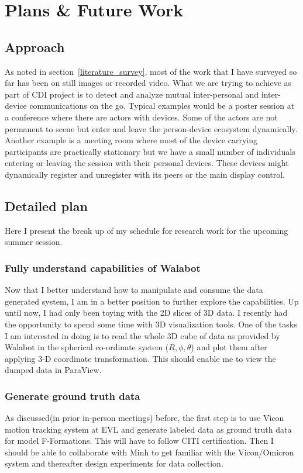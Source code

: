 \section{Plans \& Future Work}

\subsection{Approach}
As noted in section~\ref{literature_survey}, most of the work that I
have surveyed so far has been on still images or recorded video. What
we are trying to achieve as part of CDI project is to detect and
analyze mutual inter-personal and inter-device communications on the
go. Typical examples would be a poster session at a conference where
there are actors with devices. Some of the actors are not permanent to
scene but enter and leave the person-device ecosystem
dynamically. Another example is a meeting room where most of the
device carrying participants are practically stationary but we have a
small number of individuals entering or leaving the session with their
personal devices. These devices might dynamically register and
unregister with its peers or the main display control.

\subsection{Detailed plan}

Here I present the break up of my schedule for research work for the
upcoming summer session.

\subsubsection{Fully understand capabilities of Walabot}
Now that I better understand how to manipulate and consume the data
generated system, I am in a better position to further explore the
capabilities. Up until now, I had only been toying with the 2D slices
of 3D data. I recently had the opportunity to spend some time with 3D
visualization tools. One of the tasks I am interested in doing is to
read the whole 3D cube of data as provided by Walabot in the spherical
co-ordinate system ($R, \phi, \theta$) and plot them after applying
3-D coordinate transformation. This should enable me to view the
dumped data in ParaView.

\subsubsection{Generate ground truth data}
As discussed(in prior in-person meetings) before, the first step is to
use Vicon motion tracking system at EVL and generate labeled data as
ground truth data for model F-Formations. This will have to follow
CITI certification. Then I should be able to collaborate with Minh to
get familiar with the Vicon/Omicron system and thereafter design
experiments for data collection.

